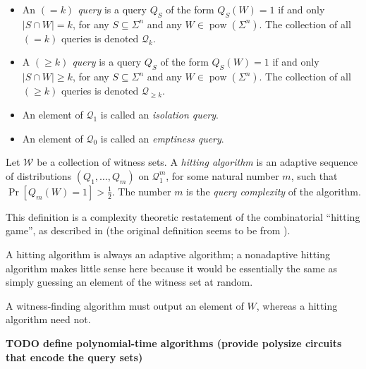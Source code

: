 \documentclass{article}
\newcommand{\todo}[1]{\textbf{TODO #1}}
\newcommand{\mc}{\mathcal}
\DeclareMathOperator{\pow}{pow}
\begin{document}
\begin{itemize}
\item
  An \emph{$(= k)$ query} is a query $Q_S$ of the form $Q_{S}(W) = 1$ if and only $|S \cap W| = k$, for any $S \subseteq \Sigma^n$ and any $W \in \pow(\Sigma^n)$.
  The collection of all $(= k)$ queries is denoted $\mc{Q}_k$.
\item
  A \emph{$(\geq k)$ query} is a query $Q_S$ of the form $Q_{S}(W) = 1$ if and only $|S \cap W| \geq k$, for any $S \subseteq \Sigma^n$ and any $W \in \pow(\Sigma^n)$.
  The collection of all $(\geq k)$ queries is denoted $\mc{Q}_{\geq k}$.
\item
  An element of $\mc{Q}_1$ is called an \emph{isolation query}.
\item
  An element of $\mc{Q}_0$ is called an \emph{emptiness query}.
\end{itemize}

\begin{definition}
  Let $\mc{W}$ be a collection of witness sets.
  A \emph{hitting algorithm} is an adaptive sequence of distributions $(Q_1, \dotsc, Q_m)$ on $\mc{Q}^m_1$, for some natural number $m$, such that $\Pr[Q_m(W) = 1] > \frac{1}{2}$.
  The number $m$ is the \emph{query complexity} of the algorithm.
\end{definition}

This definition is a complexity theoretic restatement of the combinatorial ``hitting game'', as described in \autocite[Section~3]{newport14} (the original definition seems to be from \autocite[Definition~5]{bgi92}).

A hitting algorithm is always an adaptive algorithm; a nonadaptive hitting algorithm makes little sense here because it would be essentially the same as simply guessing an element of the witness set at random.

A witness-finding algorithm must output an element of $W$, whereas a hitting algorithm need not.

\todo{define polynomial-time algorithms (provide polysize circuits that encode the query sets)}
\end{document}
